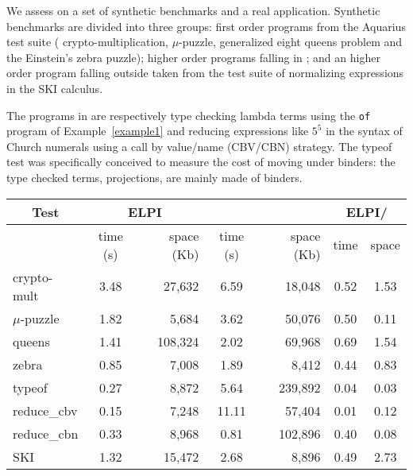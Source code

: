 \documentclass{llncs}
\begin{document}
We assess %
\elpi{} on a set of synthetic benchmarks and
a real application. Synthetic benchmarks are divided into three groups:
first order programs from the Aquarius test suite (%
crypto-multiplication, $\mu$-puzzle,
generalized eight queens problem and the Einstein's zebra puzzle);
higher order programs falling in \rff{}; and an higher
order program falling outside \rff{} taken from the test suite of
\tedius{} normalizing expressions in the SKI calculus.

The programs in \rff{} are respectively type checking lambda terms using
the \verb+of+ program of Example~\ref{example1} and reducing expressions like
$5^5$ in the syntax of Church numerals using a call by value/name (CBV/CBN)
strategy.  The typeof test was specifically conceived to measure the cost of
moving under binders: the type checked terms, projections, are mainly made of
binders.

\begin{center}
  \scriptsize 
  \begin{tabular}{|p{1.5cm}||c|r||c|r||c|c|}
    \hline
      \multicolumn{1}{|c||}{Test} &
      \multicolumn{2}{|c||}{ELPI} &
      \multicolumn{2}{|c||}{\tedius{}} &
      \multicolumn{2}{|c|}{ELPI/\tedius{}} \\
    \hline
    &  time (s)     & space (Kb)  & time (s) & space (Kb) &  time & space \\
    \hline
    \hline
    crypto-mult &  3.48 & 27,632  & 6.59 & 18,048 &  0.52 & 1.53 \\
    \hline    
    $\mu$-puzzle &  1.82 & 5,684 &  3.62 & 50,076 &  0.50 & 0.11 \\
    \hline
    queens &  1.41  & 108,324 &  2.02 & 69,968 &  0.69 & 1.54 \\
    \hline    
    zebra &  0.85 & 7,008 &  1.89 & 8,412 &  0.44 & 0.83 \\
    \hline     
    \hline
    typeof &  0.27 & 8,872 &  5.64 & 239,892 &  0.04 & 0.03 \\
    \hline
    reduce\_cbv &  0.15 & 7,248 &  11.11 & 57,404  & 0.01 & 0.12 \\
    \hline
    reduce\_cbn &  0.33 & 8,968 &  0.81 & 102,896  & 0.40 & 0.08 \\
    \hline
    \hline
    SKI &  1.32 & 15,472 &  2.68 & 8,896  & 0.49 & 2.73 \\
    \hline
    
  \end{tabular}
\end{center}
\end{document}
